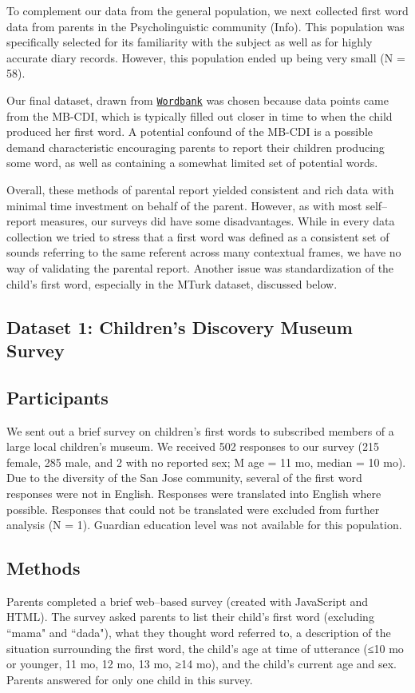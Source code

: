 \documentclass[10pt,letterpaper]{article}
\begin{document}
To complement our data from the general population, we next collected first word data from parents in the Psycholinguistic community (Info). This population was specifically selected for its familiarity with the subject as well as for highly accurate diary records. However, this population ended up being very small (N = 58).

Our final dataset, drawn from \href{http://wordbank.stanford.edu}{\tt{Wordbank}} was chosen because data points came from the MB-CDI, which is typically filled out closer in time to when the child produced her first word. A potential confound of the MB-CDI is a possible demand characteristic encouraging parents to report their children producing some word, as well as containing a somewhat limited set of potential words.

Overall, these methods of parental report yielded consistent and rich data with minimal time investment on behalf of the parent. However, as with most self--report measures, our surveys did have some disadvantages. While in every data collection we tried to stress that a first word was defined as a consistent set of sounds referring to the same referent across many contextual frames, we have no way of validating the parental report. Another issue was standardization of the child's first word, especially in the MTurk dataset, discussed below. 

\subsection{Dataset 1: Children's Discovery Museum Survey}

\subsection{Participants}
We sent out a brief survey on children's first words to subscribed members of a large local children's museum. We received 502 responses to our survey (215 female, 285 male, and 2 with no reported sex; M age = 11 mo, median = 10 mo). Due to the diversity of the San Jose community, several of the first word responses were not in English. Responses were translated into English where possible. Responses that could not be translated were excluded from further analysis (N = 1). Guardian education level was not available for this population.

\subsection{Methods}
Parents completed a brief web--based survey (created with JavaScript and HTML). The survey asked parents to list their child's first word (excluding ``mama" and ``dada"), what they thought word referred to, a description of the situation surrounding the first word, the child's age at time of utterance (≤10 mo or younger, 11 mo, 12 mo, 13 mo, ≥14 mo), and the child's current age and sex. Parents answered for only one child in this survey.
\end{document}
